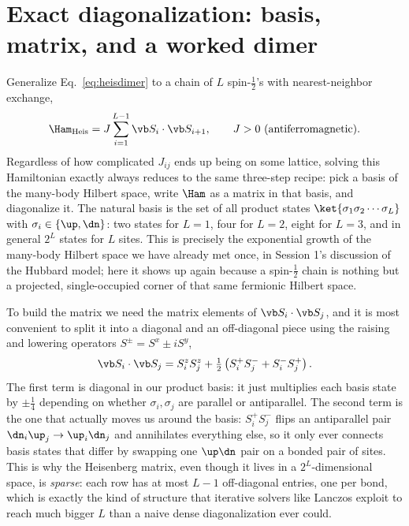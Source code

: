 \documentclass[all_sessions.tex]{subfiles}
\begin{document}
\section{Exact diagonalization: basis, matrix, and a worked dimer}
\label{sec:ed}
Generalize Eq.~\eqref{eq:heisdimer} to a chain of $L$ spin-$\tfrac12$'s with nearest-neighbor exchange,
\begin{equation}
  \Ham_{\mathrm{Heis}} = J\sum_{i=1}^{L-1} \vb S_i\cdot\vb S_{i+1}, \qquad J>0
  \ \text{(antiferromagnetic).}
  \label{eq:heisenberg}
\end{equation}
Regardless of how complicated $J_{ij}$ ends up being on some lattice, solving this Hamiltonian exactly
always reduces to the same three-step recipe: pick a basis of the many-body Hilbert space, write $\Ham$
as a matrix in that basis, and diagonalize it. The natural basis is the set of all product states
$\ket{\sigma_1\sigma_2\cdots\sigma_L}$ with $\sigma_i\in\{\up,\dn\}$: two states for $L=1$, four for
$L=2$, eight for $L=3$, and in general $2^L$ states for $L$ sites. This is precisely the exponential
growth of the many-body Hilbert space we have already met once, in Session 1's discussion of the Hubbard
model; here it shows up again because a spin-$\tfrac12$ chain is nothing but a projected, single-occupied
corner of that same fermionic Hilbert space.

To build the matrix we need the matrix elements of $\vb S_i\cdot\vb S_j$, and it is most convenient to
split it into a diagonal and an off-diagonal piece using the raising and lowering operators
$S^\pm = S^x\pm iS^y$,
\begin{equation}
  \vb S_i\cdot\vb S_j = S_i^zS_j^z + \tfrac12\left(S_i^+S_j^- + S_i^-S_j^+\right).
  \label{eq:sdots}
\end{equation}
The first term is diagonal in our product basis: it just multiplies each basis state by $\pm\tfrac14$
depending on whether $\sigma_i,\sigma_j$ are parallel or antiparallel. The second term is the one that
actually moves us around the basis: $S_i^+S_j^-$ flips an antiparallel pair $\dn_i\up_j\to\up_i\dn_j$
and annihilates everything else, so it only ever connects basis states that differ by swapping one
$\up\dn$ pair on a bonded pair of sites. This is why the Heisenberg matrix, even though it lives in a
$2^L$-dimensional space, is \emph{sparse}: each row has at most $L-1$ off-diagonal entries, one per bond,
which is exactly the kind of structure that iterative solvers like Lanczos exploit to reach much bigger
$L$ than a naive dense diagonalization ever could.
\end{document}
